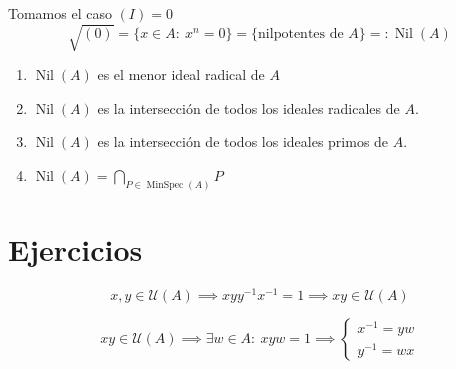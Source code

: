\documentclass[openany]{book}
\begin{document}
\begin{example}
    Tomamos el caso $ (I) = 0 $
    $$ \sqrt{(0)} = \{x \in A:\ x^{n} = 0\} = \{\text{nilpotentes de } A\} =: \operatorname{Nil}(A) $$

    \begin{enumerate}
        \item $ \operatorname{Nil}(A) $ es el menor ideal radical de $ A $ 
        \item $ \operatorname{Nil}(A) $ es la intersección de todos los ideales radicales de $ A $.
        \item $ \operatorname{Nil}(A) $ es la intersección de todos los ideales primos de $ A $.
        \item $ \operatorname{Nil}(A) = \bigcap_{P \in \operatorname{MinSpec}(A)}P$
    \end{enumerate}
\end{example}

\section{Ejercicios}


\setcounter{ex}{1}
\begin{exercise}
    $$ x,y \in \mathcal{U}(A)\implies xyy ^{-1}x ^{-1} = 1 \implies xy \in \mathcal{U}(A) $$

    $$  xy \in \mathcal{U}(A  ) \implies \exists w \in A:\ xyw = 1 \implies \left\{
    \begin{array}{l}
        x ^{-1}= yw \\
        y ^{-1} = wx
    \end{array}
    \right. $$

\end{exercise}
\end{document}

